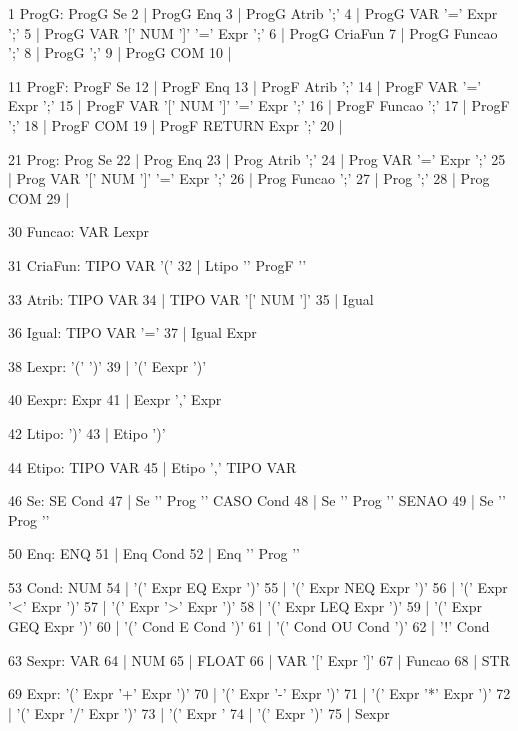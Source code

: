 \documentclass{report}
\begin{document}
\begin{code}
	
	1 ProgG: ProgG Se
	2      | ProgG Enq
	3      | ProgG Atrib ';'
	4      | ProgG VAR '=' Expr ';'
	5      | ProgG VAR '[' NUM ']' '=' Expr ';'
	6      | ProgG CriaFun
	7      | ProgG Funcao ';'
	8      | ProgG ';'
	9      | ProgG COM
	10      | %
	
	11 ProgF: ProgF Se
	12      | ProgF Enq
	13      | ProgF Atrib ';'
	14      | ProgF VAR '=' Expr ';'
	15      | ProgF VAR '[' NUM ']' '=' Expr ';'
	16      | ProgF Funcao ';'
	17      | ProgF ';'
	18      | ProgF COM
	19      | ProgF RETURN Expr ';'
	20      | %
	
	21 Prog: Prog Se
	22     | Prog Enq
	23     | Prog Atrib ';'
	24     | Prog VAR '=' Expr ';'
	25     | Prog VAR '[' NUM ']' '=' Expr ';'
	26     | Prog Funcao ';'
	27     | Prog ';'
	28     | Prog COM
	29     | %
	
	30 Funcao: VAR Lexpr
	
	31 CriaFun: TIPO VAR '('
	32        | Ltipo '{' ProgF '}'
	
	33 Atrib: TIPO VAR
	34      | TIPO VAR '[' NUM ']'
	35      | Igual
	
	36 Igual: TIPO VAR '='
	37      | Igual Expr
	
	38 Lexpr: '(' ')'
	39      | '(' Eexpr ')'
	
	40 Eexpr: Expr
	41      | Eexpr ',' Expr
	
	42 Ltipo: ')'
	43      | Etipo ')'
	
	44 Etipo: TIPO VAR
	45      | Etipo ',' TIPO VAR
	
	46 Se: SE Cond
	47   | Se '{' Prog '}' CASO Cond
	48   | Se '{' Prog '}' SENAO
	49   | Se '{' Prog '}'
	
	50 Enq: ENQ
	51    | Enq Cond
	52    | Enq '{' Prog '}'
	
	53 Cond: NUM
	54     | '(' Expr EQ Expr ')'
	55     | '(' Expr NEQ Expr ')'
	56     | '(' Expr '<' Expr ')'
	57     | '(' Expr '>' Expr ')'
	58     | '(' Expr LEQ Expr ')'
	59     | '(' Expr GEQ Expr ')'
	60     | '(' Cond E Cond ')'
	61     | '(' Cond OU Cond ')'
	62     | '!' Cond
	
	63 Sexpr: VAR
	64      | NUM
	65      | FLOAT
	66      | VAR '[' Expr ']'
	67      | Funcao
	68      | STR
	
	69 Expr: '(' Expr '+' Expr ')'
	70     | '(' Expr '-' Expr ')'
	71     | '(' Expr '*' Expr ')'
	72     | '(' Expr '/' Expr ')'
	73     | '(' Expr '%
	74     | '(' Expr ')'
	75     | Sexpr
	
\end{code}
\end{document}
